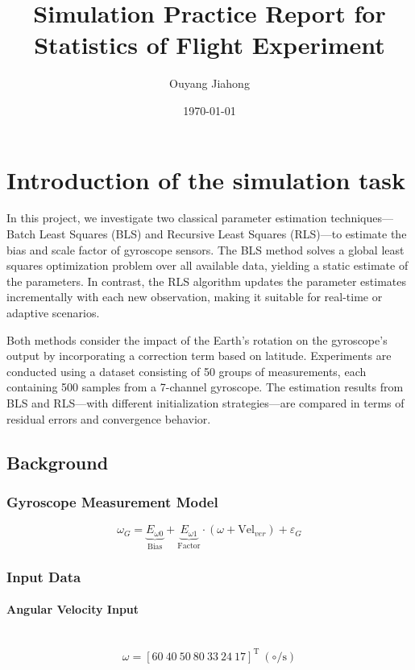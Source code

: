 \documentclass[openany,12pt,UTF8]{article}
\title{Simulation Practice Report for Statistics of Flight Experiment}
\author{Ouyang Jiahong}
\date{\today}
\begin{document}
\maketitle
\newpage
\tableofcontents
\newpage

\section{Introduction of the simulation task}
In this project, we investigate two classical parameter estimation techniques—Batch Least Squares (BLS) and Recursive Least Squares (RLS)—to estimate the bias and scale factor of gyroscope sensors. The BLS method solves a global least squares optimization problem over all available data, yielding a static estimate of the parameters. In contrast, the RLS algorithm updates the parameter estimates incrementally with each new observation, making it suitable for real-time or adaptive scenarios.

Both methods consider the impact of the Earth's rotation on the gyroscope's output by incorporating a correction term based on latitude. Experiments are conducted using a dataset consisting of 50 groups of measurements, each containing 500 samples from a 7-channel gyroscope. The estimation results from BLS and RLS—with different initialization strategies—are compared in terms of residual errors and convergence behavior.

\subsection{Background}
\subsubsection{Gyroscope Measurement Model}
\begin{equation}
    \label{equation:Gyroscope Measurement Model}
    \omega_{G} = \underbrace{E_{\omega 0}}_{\text{Bias}} + \underbrace{E_{\omega 1}}_{\text{Factor}} \cdot (\omega + \text{Vel}_{ver}) + \varepsilon_{G}
\end{equation}

\subsubsection{Input Data}
\paragraph{Angular Velocity Input}\
\begin{equation}
    \omega = [60\ 40\ 50\ 80\ 33\ 24\ 17]^{\text{T}} \ (\circ/\text{s})
\end{equation}
\end{document}
